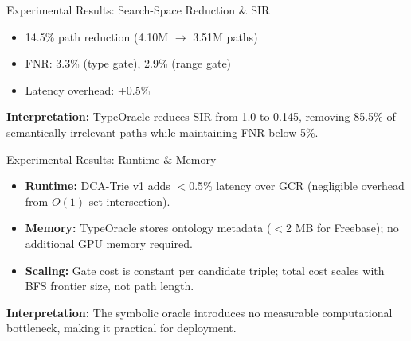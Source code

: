 \documentclass{beamer}
\begin{document}
\begin{frame}{Experimental Results: Search-Space Reduction \& SIR}
\centering
{}

\vspace{0.3em}
\begin{minipage}{0.7\textwidth}
\footnotesize
\begin{itemize}
    \item 14.5\% path reduction (4.10M $\to$ 3.51M paths)
    \item FNR: 3.3\% (type gate), 2.9\% (range gate)
    \item Latency overhead: +0.5\%
\end{itemize}
\end{minipage}

\vspace{0.5em}
\textbf{Interpretation:} TypeOracle reduces SIR from 1.0 to 0.145, removing 85.5\% of semantically irrelevant paths while maintaining FNR below 5\%.
\end{frame}

\begin{frame}{Experimental Results: Runtime \& Memory}
  \begin{itemize}
    \item \textbf{Runtime:} DCA-Trie v1 adds $<$0.5\% latency over GCR (negligible overhead from $O(1)$ set intersection).
    \vspace{0.3cm}
    \item \textbf{Memory:} TypeOracle stores ontology metadata ($<$2 MB for Freebase); no additional GPU memory required.
    \vspace{0.3cm}
    \item \textbf{Scaling:} Gate cost is constant per candidate triple; total cost scales with BFS frontier size, not path length.
  \end{itemize}

  \vspace{0.5em}
  \textbf{Interpretation:} The symbolic oracle introduces no measurable computational bottleneck, making it practical for deployment.
\end{frame}
\end{document}

